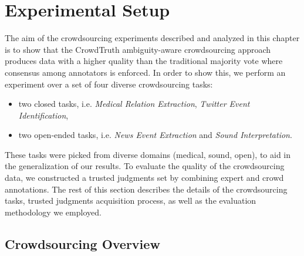 \section{Experimental Setup}
\label{sec:experimental_setup}

The aim of the crowdsourcing experiments described and analyzed in this chapter is to show that the CrowdTruth ambiguity-aware crowdsourcing approach produces data with a higher quality than the traditional majority vote where consensus among annotators is enforced. In order to show this, we perform an experiment over a set of four diverse crowdsourcing tasks: 
\begin{itemize}
    \item two closed tasks, i.e. \textit{Medical Relation Extraction}, \textit{Twitter Event Identification},
    \item two open-ended tasks, i.e. \textit{News Event Extraction} and \textit{Sound Interpretation}.
\end{itemize}
These tasks were picked from diverse domains (medical, sound, open), to aid in the generalization of our results.  To evaluate the quality of the crowdsourcing data, we constructed a trusted judgments set by combining expert and crowd annotations. The rest of this section describes the details of the crowdsourcing tasks, trusted judgments acquisition process, as well as the evaluation methodology we employed.

\subsection{Crowdsourcing Overview}
\label{subsec:detasets}



